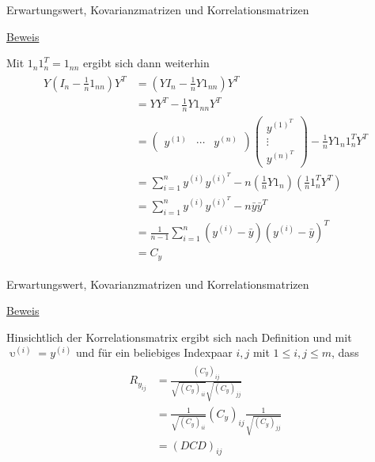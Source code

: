 \documentclass[
  8pt,
  ignorenonframetext,
]{beamer}
\DeclareMathOperator*{\ups}{\upsilon}
\begin{document}
\begin{frame}{Erwartungswert, Kovarianzmatrizen und
Korrelationsmatrizen}
\protect\hypertarget{erwartungswert-kovarianzmatrizen-und-korrelationsmatrizen-10}{}
\footnotesize

\underline{Beweis} \vspace{1mm}

Mit \(1_{n}1_{n}^T = 1_{nn}\) ergibt sich dann weiterhin \begin{align}
\begin{split}
Y\left(I_n - \frac{1}{n}1_{nn}\right)Y^T
& = \left(YI_n - \frac{1}{n}Y1_{nn}\right)Y^T                                         \\
& = YY^T - \frac{1}{n}Y1_{nn}Y^T                                                      \\
& = \begin{pmatrix} y^{(1)} & \cdots & y^{(n)}\end{pmatrix} \begin{pmatrix} y^{{(1)}^T} \\ \vdots \\ y^{{(n)}^T}\end{pmatrix} - \frac{1}{n}Y1_n 1_n^TY^T    \\
& = \sum_{i=1}^n y^{(i)}y^{{(i)}^T} - n\left(\frac{1}{n}Y1_n\right)\left(\frac{1}{n}1_n^TY^T\right)              \\
& = \sum_{i=1}^n y^{(i)}y^{{(i)}^T} - n\bar{y}\bar{y}^T                                                          \\
& = \frac{1}{n-1}\sum_{i=1}^n (y^{(i)} - \bar{y})(y^{(i)} - \bar{y})^T \\
& = C_y
\end{split}
\end{align}
\end{frame}

\begin{frame}{Erwartungswert, Kovarianzmatrizen und
Korrelationsmatrizen}
\protect\hypertarget{erwartungswert-kovarianzmatrizen-und-korrelationsmatrizen-11}{}
\footnotesize

\underline{Beweis} \vspace{1mm}

Hinsichtlich der Korrelationsmatrix ergibt sich nach Definition und mit
\({\ups}^{(i)} = y^{(i)}\) und für ein beliebiges Indexpaar \(i,j\) mit
\(1 \le i,j \le m\), dass \begin{align}
\begin{split}
R_{{y}_{ij}} 
& = \frac{(C_y)_{ij}}{\sqrt{ (C_y)_{ii}}\sqrt{ (C_y)_{jj}}}             \\
& = \frac{1}{\sqrt{(C_y)_{ii}}}(C_y)_{ij}\frac{1}{\sqrt{(C_y)_{jj}}}    \\
& = (DCD)_{ij}                                                          \\
\end{split}
\end{align}
\end{frame}
\end{document}
